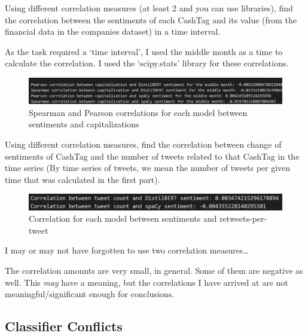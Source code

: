 \documentclass[12pt]{article}
\begin{document}
\begin{qsolve}[Task]
    Using different correlation measures (at least 2 and you can use 
    libraries), find the correlation between the sentiments of each CashTag 
    and its value (from the financial data in the companies dataset) in a 
    time interval.
\end{qsolve}

As the task required a `time interval', I used the middle month
as a time to calculate the correlation. I used the `scipy.stats' 
library for these correlations.

\begin{figure}[h!]
    \centering
    \includegraphics[width=1\textwidth]{P3.correlation.jpg}
    \caption{Spearman and Pearson correlations for 
    each model between sentiments and capitalizations}
    \label{fig:P3.correlation}
\end{figure}

\begin{qsolve}[Task]
    Using different correlation measures, find the correlation between 
    change of sentiments of CashTag and the number of tweets related to 
    that CashTag in the time series (By time series of tweets, we mean the 
    number of tweets per given time that was calculated in the first part).
\end{qsolve}

\begin{figure}[h!]
    \centering
    \includegraphics[width=1\textwidth]{P3.correlation.2.jpg}
    \caption{Correlation for 
    each model between sentiments and retweets-per-tweet}
    \label{fig:P3.correlation.2}
\end{figure}

I may or may not have forgotten to use two correlation measures\dots

The correlation amounts are very small, in general. Some of them are
negative as well. This \textit{may} have a meaning, but the correlations
I have arrived at are not meaningful/significant enough for conclusions.

\pagebreak

\subsection{Classifier Conflicts}
\end{document}
